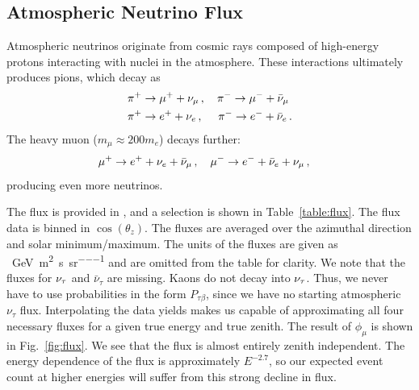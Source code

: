 \subsection{Atmospheric Neutrino Flux}
Atmospheric neutrinos originate from cosmic rays composed of high-energy protons interacting with nuclei in the atmosphere.
These interactions ultimately produces pions, which decay as 
\begin{align}\label{eq:pion}
    &\pi^+ \to \mu^+ + \nu_\mu\,, \quad \pi^- \to \mu^- + \bar{\nu}_\mu \nonumber \\
    &\pi^+ \to e^+ + \nu_e\,,\,\, \quad \pi^- \to e^- + \bar{\nu}_e\,.
\end{align}
The heavy muon ($m_\mu \approx 200m_e$) decays further:
\begin{align}
    &\mu^+ \to e^+ + \nu_e + \bar{\nu}_\mu\,, \quad \mu^- \to e^- + \bar{\nu}_e + \nu_\mu\,,
\end{align}
producing even more neutrinos.

The flux is provided in \cite{hondaData,hondaArticle}, and a selection is shown in Table~\ref{table:flux}.
The flux data is binned in $\cos(\theta_z)$. The fluxes are averaged over the azimuthal direction and solar minimum/maximum. 
The units of the fluxes are given as \si{\per\GeV \per\metre\squared \per\second \per\steradian} and are omitted
from the table for clarity. 
We note that the fluxes for $\nu_\tau$ and $\bar{\nu}_{\tau}$ are missing. Kaons do not decay into $\nu_\tau$. Thus, we never have to use probabilities in the form 
$P_{\tau \beta}$, since we have no starting atmospheric $\nu_\tau$ flux. 
Interpolating the data yields makes us capable of approximating all four necessary fluxes for a given true energy and true zenith.
The result of $\phi_\mu$ is shown in Fig.~\ref{fig:flux}. We see that the flux is almost entirely zenith independent. 
The energy dependence of the flux is approximately $E^{-2.7}$, so our expected event count at higher energies will suffer from this strong decline in flux.

